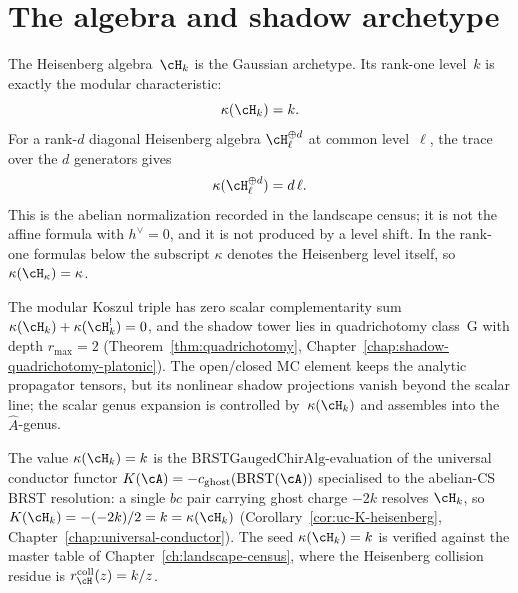 \providecommand{\BRST}{\mathrm{BRST}}
\providecommand{\BRSTGauged}{\mathrm{BRSTGaugedChirAlg}}


\section{The algebra and shadow archetype}
\label{sec:heisenberg-archetype}

The Heisenberg algebra~$\cH_k$ is the Gaussian archetype. Its
rank-one level~$k$ is exactly the modular characteristic:
\[
\kappa(\cH_k)=k.
\]
For a rank-$d$ diagonal Heisenberg algebra
$\cH_\ell^{\oplus d}$ at common level~$\ell$, the trace over
the $d$ generators gives
\[
\kappa(\cH_\ell^{\oplus d})=d\,\ell .
\]
This is the abelian normalization recorded in the landscape census;
it is not the affine formula with $h^\vee=0$, and it is not produced
by a level shift. In the rank-one formulas below the subscript
$\kappa$ denotes the Heisenberg level itself, so
$\kappa(\cH_\kappa)=\kappa$.

The modular Koszul triple has zero scalar complementarity sum
$\kappa(\cH_k)+\kappa(\cH_k^!)=0$, and the shadow tower lies in
quadrichotomy class~G with depth $r_{\max}=2$
(Theorem~\ref{thm:quadrichotomy},
Chapter~\ref{chap:shadow-quadrichotomy-platonic}). The open/closed
MC element keeps the analytic propagator tensors, but its nonlinear
shadow projections vanish beyond the scalar line; the scalar genus
expansion is controlled by~$\kappa(\cH_k)$ and assembles into the
$\hat{A}$-genus.

The value $\kappa(\cH_k) = k$ is the
$\BRSTGauged$-evaluation of the universal conductor functor
$K(\cA) = -c_{\mathrm{ghost}}(\BRST(\cA))$ specialised to the
abelian-CS BRST resolution: a single $bc$ pair carrying ghost charge
$-2k$ resolves $\cH_k$, so
$K(\cH_k) = -(-2k)/2 = k = \kappa(\cH_k)$
(Corollary~\ref{cor:uc-K-heisenberg},
Chapter~\ref{chap:universal-conductor}). The seed
$\kappa(\cH_k)=k$ is verified against the master table of
Chapter~\ref{ch:landscape-census}, where the Heisenberg collision
residue is $r^{\mathrm{coll}}_{\cH}(z)=k/z$.

